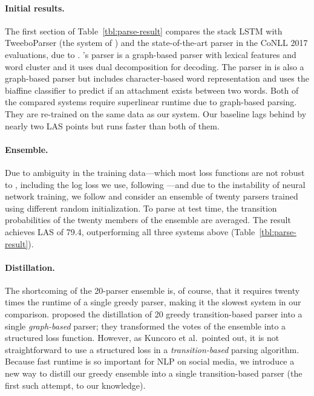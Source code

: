 \documentclass[11pt,a4paper]{article}
\begin{document}
\paragraph{Initial results.}  The first section of Table~\ref{tbl:parse-result} compares
the stack LSTM with {\sc TweeboParser} (the system 
of \citealp{kong-EtAl:2014:EMNLP2014}) and the state-of-the-art parser
in the CoNLL 2017 evaluations, due to
 \citet{dozat-qi-manning:2017:K17-3}.
 \citet{kong-EtAl:2014:EMNLP2014}'s parser is a graph-based
parser with lexical features and word cluster and it uses dual decomposition
for decoding. The parser in \citet{dozat-qi-manning:2017:K17-3} is also a graph-based parser
but includes character-based word representation and uses the biaffine classifier
to predict if an attachment exists between two words.
Both of the compared systems require superlinear runtime due to graph-based parsing. 
They are re-trained on the same data as our
system.
Our baseline lags behind by nearly two LAS
points but runs faster than both of them.

\paragraph{Ensemble.}  Due to ambiguity in the training
data---which most loss functions are not robust to \citep{Frnay2014ClassificationIT}, including the log loss we use, following
\citet{ballesteros-dyer-smith:2015:EMNLP}---and due to the instability
of neural network training, we follow \citet{Dietterich2000} and
consider an ensemble of twenty parsers trained using different random
initialization.  To parse at test time, the transition probabilities of the twenty
members of the ensemble are averaged.  The result achieves LAS of
79.4, outperforming all three systems above (Table~\ref{tbl:parse-result}).

\paragraph{Distillation.}  The shortcoming of the 20-parser ensemble is, of
course, that it requires twenty times the runtime of a single greedy
parser, making it the slowest system in our comparison.   proposed the distillation of 20
greedy transition-based parser into a single \emph{graph-based}
parser; they transformed the votes of the ensemble into a structured
loss function.  However, as Kuncoro et al.~pointed out, 
it is not straightforward to use a structured
loss in a \emph{transition-based} parsing algorithm.  Because fast
runtime is so important for NLP on social media, we
introduce a new way to distill our greedy ensemble into a single
transition-based parser (the first such attempt, to our knowledge).  
\end{document}
